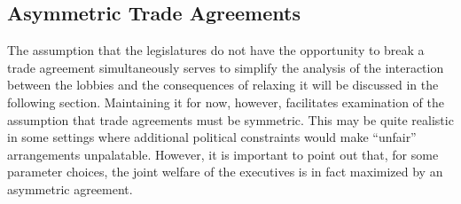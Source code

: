 \documentclass[10pt]{article}
\newcommand{\ve}{\theta}
\newcommand{\expect}{\mathbb{E}}
\newcommand{\ga}{\gamma}
\begin{document}

\subsection{Asymmetric Trade Agreements}
\label{sec:asym}
The assumption that the legislatures do not have the opportunity to break a trade agreement simultaneously serves to simplify the analysis of the interaction between the lobbies and the consequences of relaxing it will be discussed in the following section. Maintaining it for now, however, facilitates examination of the assumption that trade agreements must be symmetric. This may be quite realistic in some settings where additional political constraints would make ``unfair'' arrangements unpalatable. However, it is important to point out that, for some parameter choices, the joint welfare of the executives is in fact maximized by an asymmetric agreement.
\end{document}
